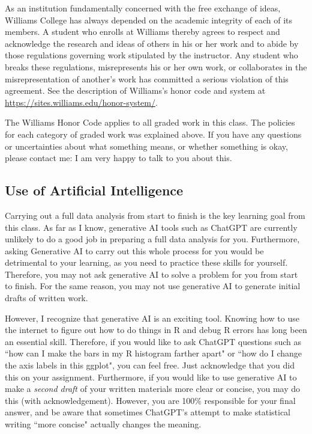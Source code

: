 \documentclass[11pt]{article}
\begin{document}
As an institution fundamentally concerned with the free exchange of ideas, Williams College has
always depended on the academic integrity of each of its members. A student who enrolls at
Williams thereby agrees to respect and acknowledge the research and ideas of others in his or her
work and to abide by those regulations governing work stipulated by the instructor. Any student
who breaks these regulations, misrepresents his or her own work, or collaborates in the misrepresentation of another's work has committed a serious violation of this agreement. See the description of Williams's honor code and system at \url{https://sites.williams.edu/honor-system/}.

The Williams Honor Code applies to all graded work in this class. The policies for each category of graded work was explained above. If you have any questions or uncertainties about what something means, or whether something is okay, please contact me: I am very happy to talk to you about this.

\subsection{Use of Artificial Intelligence}

Carrying out a full data analysis from start to finish is the key learning goal from this class. As far as I know, generative AI tools such as ChatGPT are currently unlikely to do a good job in preparing a full data analysis for you. Furthermore, asking Generative AI to carry out this whole process for you would be detrimental to your learning, as you need to practice these skills for yourself. Therefore, you may not ask generative AI to solve a problem for you from start to finish. For the same reason, you may not use generative AI to generate initial drafts of written work.

However, I recognize that generative AI is an exciting tool. Knowing how to use the internet to figure out how to do things in R and debug R errors has long been an essential skill. Therefore, if you would like to ask ChatGPT questions such as ``how can I make the bars in my R histogram farther apart" or ``how do I change the axis labels in this ggplot", you can feel free. Just acknowledge that you did this on your assignment. Furthermore, if you would like to use generative AI to make a \emph{second draft} of your written materials more clear or concise, you may do this (with acknowledgement). However, you are 100\% responsible for your final answer, and be aware that sometimes ChatGPT's attempt to make statistical writing ``more concise" actually changes the meaning.
\end{document}
